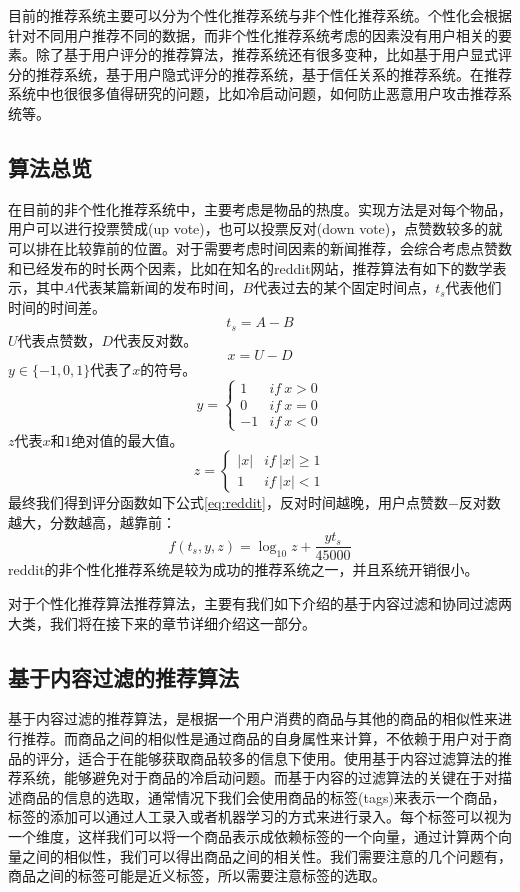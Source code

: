 目前的推荐系统主要可以分为个性化推荐系统与非个性化推荐系统。个性化会根据针对不同用户推荐不同的数据，而非个性化推荐系统考虑的因素没有用户相关的要素。除了基于用户评分的推荐算法，推荐系统还有很多变种，比如基于用户显式评分的推荐系统，基于用户隐式评分的推荐系统，基于信任关系的推荐系统。在推荐系统中也很很多值得研究的问题，比如冷启动问题，如何防止恶意用户攻击推荐系统等。

\subsection{算法总览}
在目前的非个性化推荐系统中，主要考虑是物品的热度。实现方法是对每个物品，用户可以进行投票赞成(up vote)，也可以投票反对(down vote)，点赞数较多的就可以排在比较靠前的位置。对于需要考虑时间因素的新闻推荐，会综合考虑点赞数和已经发布的时长两个因素，比如在知名的reddit网站，推荐算法有如下的数学表示，其中$A$代表某篇新闻的发布时间，$B$代表过去的某个固定时间点，$t_s$代表他们时间的时间差。
$$ t_s = A - B $$
$U$代表点赞数，$D$代表反对数。
$$x = U - D$$
$y \in \{-1, 0, 1\}$代表了$x$的符号。
$$ y = \begin{cases}
    1 & if\ x > 0 \\
    0 & if\ x = 0 \\
    -1 & if\ x < 0
\end{cases}$$
$z$代表$x$和$1$绝对值的最大值。
$$z = \begin{cases}
\lvert x \rvert  &  if\  \lvert x \rvert \geq 1 \\
1 & if\  \lvert x \rvert < 1
 \end{cases}
$$
最终我们得到评分函数如下公式\ref{eq:reddit}，反对时间越晚，用户点赞数$-$反对数越大，分数越高，越靠前：
\begin{equation}\label{eq:reddit}
f(t_s, y, z) = \log_{10}z + \frac{yt_s}{45000}    
\end{equation}
reddit的非个性化推荐系统是较为成功的推荐系统之一，并且系统开销很小。

对于个性化推荐算法推荐算法，主要有我们如下介绍的基于内容过滤和协同过滤两大类，我们将在接下来的章节详细介绍这一部分。

\subsection{基于内容过滤的推荐算法}
基于内容过滤的推荐算法，是根据一个用户消费的商品与其他的商品的相似性来进行推荐。而商品之间的相似性是通过商品的自身属性来计算，不依赖于用户对于商品的评分，适合于在能够获取商品较多的信息下使用。使用基于内容过滤算法的推荐系统，能够避免对于商品的冷启动问题。而基于内容的过滤算法的关键在于对描述商品的信息的选取，通常情况下我们会使用商品的标签(tags)来表示一个商品，标签的添加可以通过人工录入或者机器学习的方式来进行录入。每个标签可以视为一个维度，这样我们可以将一个商品表示成依赖标签的一个向量，通过计算两个向量之间的相似性，我们可以得出商品之间的相关性。我们需要注意的几个问题有，商品之间的标签可能是近义标签，所以需要注意标签的选取。

